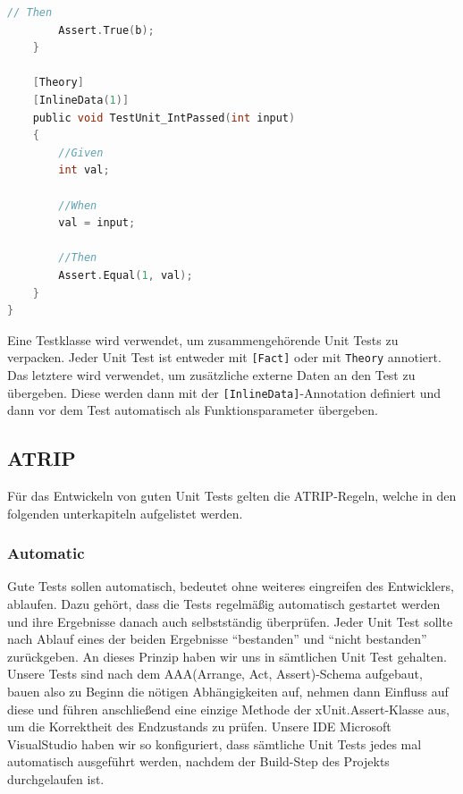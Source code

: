 \documentclass[
10pt, %
a4paper, %
oneside, %
headinclude,footinclude, %
BCOR5mm, %
]{scrartcl}
\begin{document}
\begin{onehalfspace}
\begin{lstlisting}[language=c, style=mStyle]
		// Then
		Assert.True(b);
	}

	[Theory]
	[InlineData(1)]
	public void TestUnit_IntPassed(int input)
	{
		//Given
		int val;

		//When
		val = input;

		//Then
		Assert.Equal(1, val);
	}
}
\end{lstlisting}

Eine Testklasse wird verwendet, um zusammengehörende Unit Tests zu verpacken. Jeder Unit Test ist entweder mit \texttt{[Fact]} oder mit \texttt{Theory} annotiert. Das letztere wird verwendet, um zusätzliche externe Daten an den Test zu übergeben. Diese werden dann mit der \texttt{[InlineData]}-Annotation definiert und dann vor dem Test automatisch als Funktionsparameter übergeben.
\subsection{ATRIP}
Für das Entwickeln von guten Unit Tests gelten die ATRIP-Regeln, welche in den folgenden unterkapiteln aufgelistet werden.
\subsubsection{Automatic}
Gute Tests sollen automatisch, bedeutet ohne weiteres eingreifen des Entwicklers, ablaufen. Dazu gehört, dass die Tests regelmäßig automatisch gestartet werden und ihre Ergebnisse danach auch selbstständig überprüfen. Jeder Unit Test sollte nach Ablauf eines der beiden Ergebnisse \enquote{bestanden} und \enquote{nicht bestanden} zurückgeben.
An dieses Prinzip haben wir uns in sämtlichen Unit Test gehalten. Unsere Tests sind nach dem AAA(Arrange, Act, Assert)-Schema aufgebaut, bauen also zu Beginn die nötigen Abhängigkeiten auf, nehmen dann Einfluss auf diese und führen anschließend eine einzige Methode der xUnit.Assert-Klasse aus, um die Korrektheit des Endzustands zu prüfen. Unsere IDE Microsoft VisualStudio haben wir so konfiguriert, dass sämtliche Unit Tests jedes mal automatisch ausgeführt werden, nachdem der Build-Step des Projekts durchgelaufen ist.


\end{onehalfspace}
\end{document}
